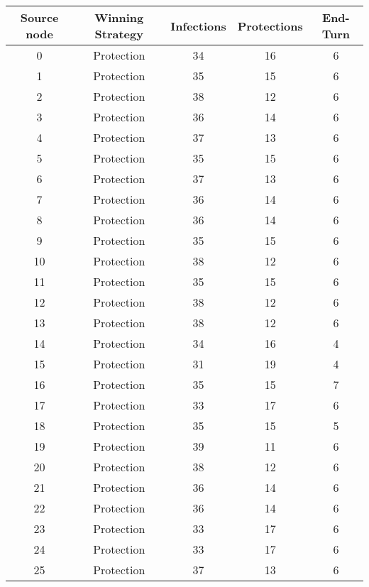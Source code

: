 \documentclass[results.tex]{subfiles}
\begin{document}
\begin{center}
  \begin{tabular}{| c || c | c | c | c |}
    \hline
    {\bfseries Source node} & {\bfseries Winning Strategy} & {\bfseries Infections} & {\bfseries Protections} & {\bfseries End-Turn} \\  %
    \hline\hline
    0 & Protection & 34 & 16 & 6 \\ 
    \hline
    1 & Protection & 35 & 15 & 6 \\ 
    \hline
    2 & Protection & 38 & 12 & 6 \\ 
    \hline
    3 & Protection & 36 & 14 & 6 \\ 
    \hline
    4 & Protection & 37 & 13 & 6 \\ 
    \hline
    5 & Protection & 35 & 15 & 6 \\ 
    \hline
    6 & Protection & 37 & 13 & 6 \\ 
    \hline
    7 & Protection & 36 & 14 & 6 \\ 
    \hline
    8 & Protection & 36 & 14 & 6 \\ 
    \hline
    9 & Protection & 35 & 15 & 6 \\ 
    \hline
    10 & Protection & 38 & 12 & 6 \\ 
    \hline
    11 & Protection & 35 & 15 & 6 \\ 
    \hline
    12 & Protection & 38 & 12 & 6 \\ 
    \hline
    13 & Protection & 38 & 12 & 6 \\ 
    \hline
    14 & Protection & 34 & 16 & 4 \\ 
    \hline
    15 & Protection & 31 & 19 & 4 \\ 
    \hline
    16 & Protection & 35 & 15 & 7 \\ 
    \hline
    17 & Protection & 33 & 17 & 6 \\ 
    \hline
    18 & Protection & 35 & 15 & 5 \\ 
    \hline
    19 & Protection & 39 & 11 & 6 \\ 
    \hline
    20 & Protection & 38 & 12 & 6 \\ 
    \hline
    21 & Protection & 36 & 14 & 6 \\ 
    \hline
    22 & Protection & 36 & 14 & 6 \\ 
    \hline
    23 & Protection & 33 & 17 & 6 \\ 
    \hline
    24 & Protection & 33 & 17 & 6 \\ 
    \hline
    25 & Protection & 37 & 13 & 6 \\ 

\end{tabular}
\end{center}
\end{document}
